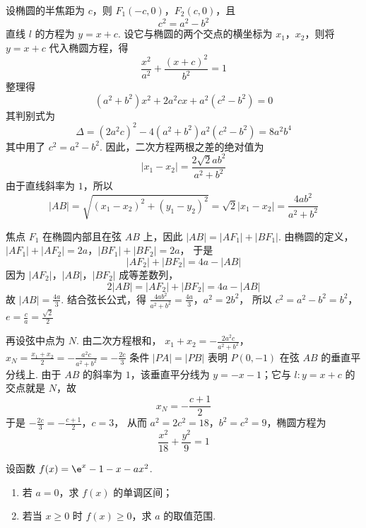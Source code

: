\begin{solution}
设椭圆的半焦距为 \(c\)，则 \(F_1(-c,0)\)，\(F_2(c,0)\)，且
\[
c^2=a^2-b^2
\]
直线 \(l\) 的方程为 \(y=x+c\). 设它与椭圆的两个交点的横坐标为 \(x_1\)，\(x_2\)，则将 \(y=x+c\) 代入椭圆方程，得
\[
\frac{x^2}{a^2}+\frac{(x+c)^2}{b^2}=1
\]
整理得
\[
(a^2+b^2)x^2+2a^2cx+a^2(c^2-b^2)=0
\]
其判别式为
\[
\Delta=(2a^2c)^2-4(a^2+b^2)a^2(c^2-b^2)=8a^2b^4
\]
其中用了 \(c^2=a^2-b^2\). 因此，二次方程两根之差的绝对值为
\[
|x_1-x_2|=\frac{2\sqrt{2}ab^2}{a^2+b^2}
\]
由于直线斜率为 \(1\)，所以
\[
|AB|=\sqrt{(x_1-x_2)^2+(y_1-y_2)^2}
=\sqrt{2}|x_1-x_2|
=\frac{4ab^2}{a^2+b^2}
\]

焦点 \(F_1\) 在椭圆内部且在弦 \(AB\) 上，因此 \(|AB|=|AF_1|+|BF_1|\). 由椭圆的定义，
\(|AF_1|+|AF_2|=2a\)，\(|BF_1|+|BF_2|=2a\)，
于是
\[
|AF_2|+|BF_2|=4a-|AB|
\]
因为 \(|AF_2|\)，\(|AB|\)，\(|BF_2|\) 成等差数列，
\[
2|AB|=|AF_2|+|BF_2|=4a-|AB|
\]
故 \(|AB|=\frac{4a}{3}\). 结合弦长公式，得
\(\frac{4ab^2}{a^2+b^2}=\frac{4a}{3}\)，\(a^2=2b^2\)，
所以
\(c^2=a^2-b^2=b^2\)，\(e=\frac ca=\frac{\sqrt{2}}{2}\)

再设弦中点为 \(N\). 由二次方程根和，
\(x_1+x_2=-\frac{2a^2c}{a^2+b^2}\)，\(x_N=\frac{x_1+x_2}{2}=-\frac{a^2c}{a^2+b^2}=-\frac{2c}{3}\)
条件 \(|PA|=|PB|\) 表明 \(P(0,-1)\) 在弦 \(AB\) 的垂直平分线上. 由于 \(AB\) 的斜率为 \(1\)，该垂直平分线为 \(y=-x-1\)；它与 \(l:y=x+c\) 的交点就是 \(N\)，故
\[
x_N=-\frac{c+1}{2}
\]
于是
\(-\frac{2c}{3}=-\frac{c+1}{2}\)，\(c=3\)，
从而 \(a^2=2c^2=18\)，\(b^2=c^2=9\)，椭圆方程为
\[
\frac{x^2}{18}+\frac{y^2}{9}=1
\]
\end{solution}

\begin{problem}
设函数 \( f(x) = \e^{x} - 1 - x - ax^2 \).

\begin{enumerate}
\item 若 \(a = 0\)，求 \(f(x)\) 的单调区间；
\item 若当 \(x \geqslant 0\) 时 \(f(x) \geqslant 0\)，求 \(a\) 的取值范围.
\end{enumerate}
\end{problem}

